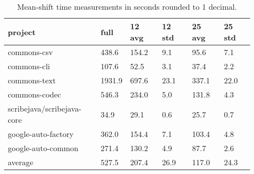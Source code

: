 \documentclass[twoside]{uva-inf-bachelor-thesis}
\begin{document}
\begin{table}[h]
    \centering
    \begin{tabular}{|l|l|l|l|l|l|}
    \hline
        project & full & 12 avg & 12 std & 25 avg & 25 std \\ \hline
        commons-csv & 438.6 & 154.2 & 9.1 & 95.6 & 7.1 \\ \hline
        commons-cli & 107.6 & 52.5 & 3.1 & 37.4 & 2.2 \\ \hline
        commons-text & 1931.9 & 697.6 & 23.1 & 337.1 & 22.0 \\ \hline
        commons-codec & 546.3 & 234.0 & 5.0 & 131.8 & 4.3 \\ \hline
        scribejava/scribejava-core & 34.9 & 29.1 & 0.6 & 25.7 & 0.7 \\ \hline
        google-auto-factory & 362.0 & 154.4 & 7.1 & 103.4 & 4.8 \\ \hline
        google-auto-common & 271.4 & 130.2 & 4.9 & 87.7 & 2.6 \\ \hline
        average & 527.5 & 207.4 & 26.9 & 117.0 & 24.3  \\ \hline
    \end{tabular}
\caption{Mean-shift time measurements in seconds rounded to 1 decimal.}
\end{table}
\end{document}
